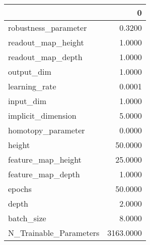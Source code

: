 \begin{tabular}{lr}
\toprule
{} &          0 \\
\midrule
robustness\_parameter   &     0.3200 \\
readout\_map\_height     &     1.0000 \\
readout\_map\_depth      &     1.0000 \\
output\_dim             &     1.0000 \\
learning\_rate          &     0.0001 \\
input\_dim              &     1.0000 \\
implicit\_dimension     &     5.0000 \\
homotopy\_parameter     &     0.0000 \\
height                 &    50.0000 \\
feature\_map\_height     &    25.0000 \\
feature\_map\_depth      &     1.0000 \\
epochs                 &    50.0000 \\
depth                  &     2.0000 \\
batch\_size             &     8.0000 \\
N\_Trainable\_Parameters &  3163.0000 \\
\bottomrule
\end{tabular}
